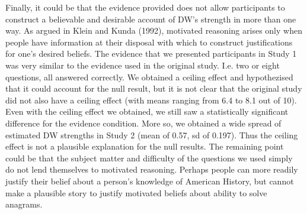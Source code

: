 \documentclass{article} \usepackage{apacite} \usepackage{graphicx} \usepackage{listings}
\begin{document}
Finally, it could be that the evidence provided does not allow participants to construct a believable and desirable account of DW's strength in more than one way. As argued in Klein and Kunda (1992), motivated reasoning arises only when people have information at their disposal with which to construct justifications for one's desired beliefs. The evidence that we presented participants in Study 1 was very similar to the evidence used in the original study. I.e. two or eight questions, all answered correctly. We obtained a ceiling effect and hypothezised that it could account for the null result, but it is not clear that the original study did not also have a ceiling effect (with means ranging from 6.4 to 8.1 out of 10). Even with the ceiling effect we obtained, we still saw a statistically significant difference for the evidence condition. More so, we obtained a wide spread of estimated DW strengths in Study 2 (mean of 0.57, sd of 0.197). Thus the ceiling effect is not a plausible explanation for the null results. The remaining point could be that the subject matter and difficulty of the questions we used simply do not lend themselves to motivated reasoning. Perhaps people can more readily justify their belief about a person's knowledge of American History, but cannot make a plausible story to justify motivated beliefs about ability to solve anagrams. 
\end{document}
